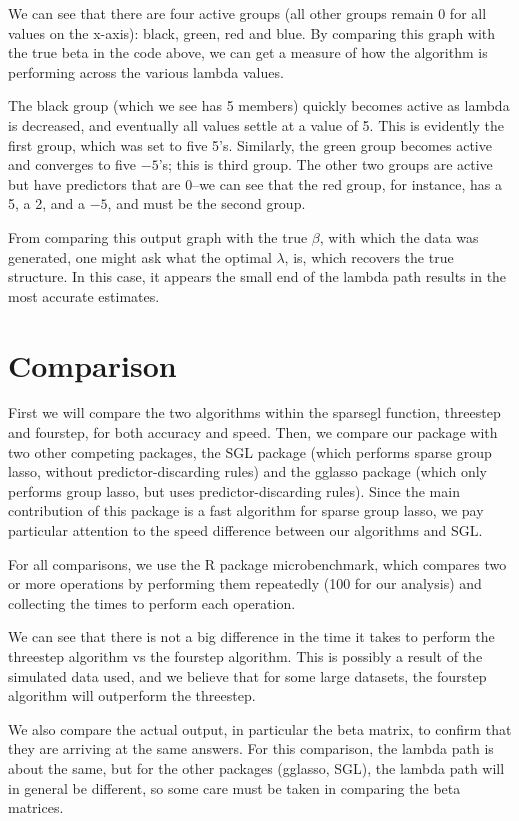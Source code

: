 \documentclass[titlepage]{article}
\begin{document}
We can see that there are four active groups (all other groups remain 0 for all values on the x-axis): black, green, red and blue. By comparing this graph with the true beta in the code above, we can get a measure of how the algorithm is performing across the various lambda values.

The black group (which we see has 5 members) quickly becomes active as lambda is decreased, and eventually all values settle at a value of 5. This is evidently the first group, which was set to five 5's. Similarly, the green group becomes active and converges to five $-5$'s; this is third group. The other two groups are active but have predictors that are 0--we can see that the red group, for instance, has a 5, a 2, and a $-5$, and must be the second group.

From comparing this output graph with the true $\beta$, with which the data was generated, one might ask what the optimal $\lambda$, is, which recovers the true structure. In this case, it appears the small end of the lambda path results in the most accurate estimates.


\section{Comparison}

First we will compare the two algorithms within the sparsegl function, threestep and fourstep, for both accuracy and speed. Then, we compare our package with two other competing packages, the SGL package (which performs sparse group lasso, without predictor-discarding rules) and the gglasso package (which only performs group lasso, but uses predictor-discarding rules). Since the main contribution of this package is a fast algorithm for sparse group lasso, we pay particular attention to the speed difference between our algorithms and SGL.

For all comparisons, we use the R package microbenchmark, which compares two or more operations by performing them repeatedly (100 for our analysis) and collecting the times to perform each operation.

We can see that there is not a big difference in the time it takes to perform the threestep algorithm vs the fourstep algorithm. This is possibly a result of the simulated data used, and we believe that for some large datasets, the fourstep algorithm will outperform the threestep.

We also compare the actual output, in particular the beta matrix, to confirm that they are arriving at the same answers. For this comparison, the lambda path is about the same, but for the other packages (gglasso, SGL), the lambda path will in general be different, so some care must be taken in comparing the beta matrices.
\end{document}
